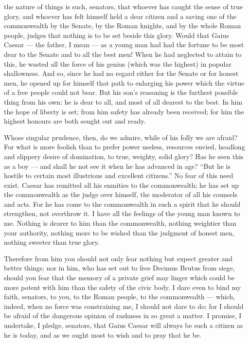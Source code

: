  the nature of things is such, senators, that whoever has caught the sense of true glory, and whoever has felt himself held a dear citizen and a saving one of the commonwealth by the Senate, by the Roman knights, and by the whole Roman people, judges that nothing is to be set beside this glory. Would that Gaius Caesar --- the father, I mean --- as a young man had had the fortune to be most dear to the Senate and to all the best men! When he had neglected to attain to this, he wasted all the force of his genius (which was the highest) in popular shallowness. And so, since he had no regard either for the Senate or for honest men, he opened up for himself that path to enlarging his power which the virtue of a free people could not bear. But his son's reasoning is the furthest possible thing from his own: he is dear to all, and most of all dearest to the best. In him the hope of liberty is set; from him safety has already been received; for him the highest honours are both sought out and ready.

 Whose singular prudence, then, do we admire, while of his folly we are afraid? For what is more foolish than to prefer power useless, resources envied, headlong and slippery desire of domination, to true, weighty, solid glory? Has he seen this as a boy --- and shall he not see it when he has advanced in age? ``But he is hostile to certain most illustrious and excellent citizens.'' No fear of this need exist. Caesar has remitted all his enmities to the commonwealth; he has set up the commonwealth as the judge over himself, the moderator of all his counsels and acts. For he has come to the commonwealth in such a spirit that he should strengthen, not overthrow it. I have all the feelings of the young man known to me. Nothing is dearer to him than the commonwealth, nothing weightier than your authority, nothing more to be wished than the judgment of honest men, nothing sweeter than true glory.

 Therefore from him you should not only fear nothing but expect greater and better things; nor in him, who has set out to free Decimus Brutus from siege, should you fear that the memory of a private grief may linger which could be more potent with him than the safety of the civic body. I dare even to bind my faith, senators, to you, to the Roman people, to the commonwealth --- which, indeed, when no force was constraining me, I should not dare to do; for I should be afraid of the dangerous opinion of rashness in so great a matter. I promise, I undertake, I pledge, senators, that Gaius Caesar will always be such a citizen as he is today, and as we ought most to wish and to pray that he be.

